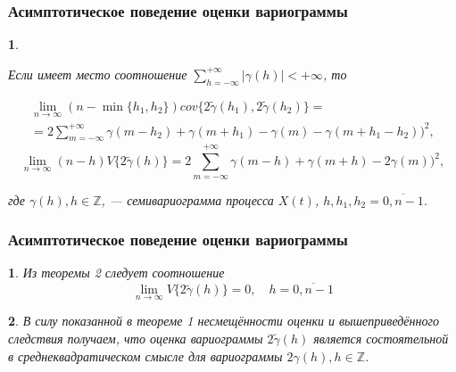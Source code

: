 \documentclass[notheorems]{beamer}
\newtheorem{theorem}{\translate{Theorem}}[section]
\newtheorem{theorem}{\translate{Theorem}}
\newtheorem{corollary}{\translate{Corollary}}
\theoremstyle{definition}
\theoremstyle{example}
\theoremstyle{plain}
\newenvironment{Theorem}{\begin{theorem}}{\end{theorem}}
\newenvironment{Corollary}{\begin{corollary}}{\end{corollary}}
\begin{document}
\begin{frame}
  \frametitle{Асимптотическое поведение оценки вариограммы}
  \begin{Theorem}
  \begin{footnotesize}
  Если имеет место соотношение $ \sum_{h = -\infty}^{+\infty} \vert \gamma(h) \vert < +\infty $, то
  \end{footnotesize}
  \begin{eqnarray*}
    \lim_{n \to \infty} (n - \min\{ h_1, h_2 \}) cov\{ 2 \tilde{\gamma}(h_1), 2 \tilde{\gamma}(h_2) \} = \nonumber \\
    = 2 \sum_{m = -\infty}^{+\infty} \gamma(m - h_2) + \gamma(m + h_1) - \gamma(m) - \gamma(m + h_1 - h_2))^2,
  \end{eqnarray*}
  \begin{equation*}
    \lim_{n \to \infty} (n - h) V\{ 2 \tilde{\gamma}(h) \} = 2 \sum_{m = -\infty}^{+\infty} \gamma(m - h) + \gamma(m + h) - 2 \gamma(m))^2,
  \end{equation*}
  \begin{footnotesize}
  где $ \gamma(h), h \in \mathbb{Z} $, --- семивариограмма процесса $ X(t) $, $ h, h_1, h_2 = \overline{0, n - 1} $.
  \end{footnotesize}
\end{Theorem}
\end{frame}

\begin{frame}
  \frametitle{Асимптотическое поведение оценки вариограммы}
  \begin{Corollary}
    Из теоремы 2 следует соотношение
    \begin{equation*}
      \lim_{n \to \infty} V\{ 2 \tilde{\gamma}(h) \} = 0, \quad h = \overline{0, n - 1}
    \end{equation*}
  \end{Corollary}

  \begin{Corollary}
    В силу показанной в теореме 1 несмещённости оценки и вышеприведённого следствия получаем, что оценка вариограммы $ 2\tilde{\gamma}(h) $ является состоятельной в среднеквадратическом смысле для вариограммы $ 2\gamma(h), h \in \mathbb{Z} $.
  \end{Corollary}
\end{frame}
\end{document}
